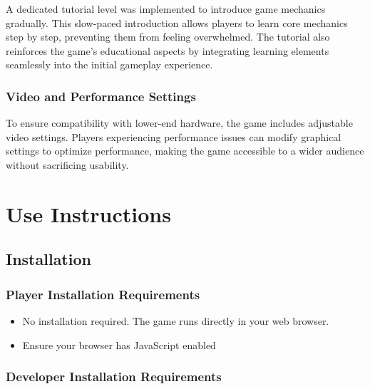 \documentclass[11pt, a4paper]{article}
\begin{document}
\noindent A dedicated tutorial level was implemented to introduce game mechanics gradually. This slow-paced introduction allows players to learn core mechanics step by step, preventing them from feeling overwhelmed. The tutorial also reinforces the game’s educational aspects by integrating learning elements seamlessly into the initial gameplay experience.

\subsubsection{Video and Performance Settings}

\noindent To ensure compatibility with lower-end hardware, the game includes adjustable video settings. Players experiencing performance issues can modify graphical settings to optimize performance, making the game accessible to a wider audience without sacrificing usability.

\section{Use Instructions}

\subsection{Installation}

\subsubsection{Player Installation Requirements}

\begin{itemize}
    \item No installation required. The game runs directly in your web browser.
    \item Ensure your browser has JavaScript enabled
\end{itemize}

\subsubsection{Developer Installation Requirements}
\end{document}

